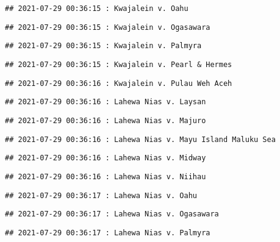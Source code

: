 \documentclass[
]{article}
\begin{document}
\begin{verbatim}
## 2021-07-29 00:36:15 : Kwajalein v. Oahu
\end{verbatim}

\begin{verbatim}
## 2021-07-29 00:36:15 : Kwajalein v. Ogasawara
\end{verbatim}

\begin{verbatim}
## 2021-07-29 00:36:15 : Kwajalein v. Palmyra
\end{verbatim}

\begin{verbatim}
## 2021-07-29 00:36:15 : Kwajalein v. Pearl & Hermes
\end{verbatim}

\begin{verbatim}
## 2021-07-29 00:36:16 : Kwajalein v. Pulau Weh Aceh
\end{verbatim}

\begin{verbatim}
## 2021-07-29 00:36:16 : Lahewa Nias v. Laysan
\end{verbatim}

\begin{verbatim}
## 2021-07-29 00:36:16 : Lahewa Nias v. Majuro
\end{verbatim}

\begin{verbatim}
## 2021-07-29 00:36:16 : Lahewa Nias v. Mayu Island Maluku Sea
\end{verbatim}

\begin{verbatim}
## 2021-07-29 00:36:16 : Lahewa Nias v. Midway
\end{verbatim}

\begin{verbatim}
## 2021-07-29 00:36:16 : Lahewa Nias v. Niihau
\end{verbatim}

\begin{verbatim}
## 2021-07-29 00:36:17 : Lahewa Nias v. Oahu
\end{verbatim}

\begin{verbatim}
## 2021-07-29 00:36:17 : Lahewa Nias v. Ogasawara
\end{verbatim}

\begin{verbatim}
## 2021-07-29 00:36:17 : Lahewa Nias v. Palmyra
\end{verbatim}
\end{document}
